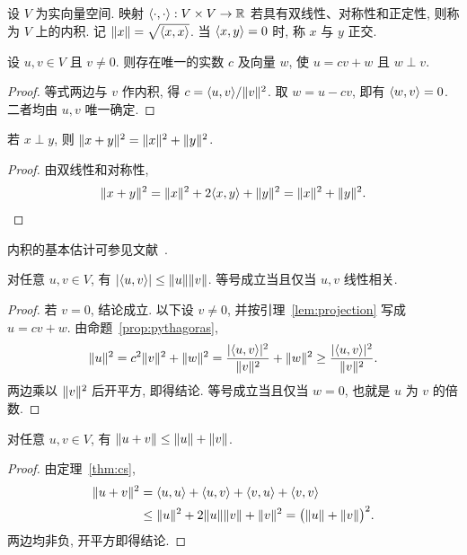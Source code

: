 \begin{definition}
设 $V$ 为实向量空间. 映射 $\langle \cdot,\cdot\rangle:V\times V\to\mathbb R$
若具有双线性、对称性和正定性, 则称为 $V$ 上的内积.
记 $\lVert x\rVert=\sqrt{\langle x,x\rangle}$. 当 $\langle x,y\rangle=0$ 时, 称 $x$ 与 $y$ 正交.
\end{definition}
\begin{lemma}\label{lem:projection}
设 $u,v\in V$ 且 $v\ne0$. 则存在唯一的实数 $c$ 及向量 $w$, 使
$u=cv+w$ 且 $w\perp v$.
\end{lemma}
\begin{proof}
等式两边与 $v$ 作内积, 得 $c=\langle u,v\rangle/\lVert v\rVert^{2}$.
取 $w=u-cv$, 即有 $\langle w,v\rangle=0$. 二者均由 $u,v$ 唯一确定.
\end{proof}
\begin{proposition}\label{prop:pythagoras}
若 $x\perp y$, 则 $\lVert x+y\rVert^{2}=\lVert x\rVert^{2}+\lVert y\rVert^{2}$.
\end{proposition}
\begin{proof}
由双线性和对称性,
\[
\lVert x+y\rVert^{2}=\lVert x\rVert^{2}+2\langle x,y\rangle+\lVert y\rVert^{2}
=\lVert x\rVert^{2}+\lVert y\rVert^{2}.\qedhere
\]
\end{proof}
内积的基本估计可参见文献~\cite[第 6A 节]{axler}.
\begin{theorem}[柯西--施瓦茨不等式]\label{thm:cs}
对任意 $u,v\in V$, 有 $|\langle u,v\rangle|\le\lVert u\rVert\lVert v\rVert$.
等号成立当且仅当 $u,v$ 线性相关.
\end{theorem}
\begin{proof}
若 $v=0$, 结论成立. 以下设 $v\ne0$, 并按引理~\ref{lem:projection} 写成 $u=cv+w$.
由命题~\ref{prop:pythagoras},
\[
\lVert u\rVert^{2}=c^{2}\lVert v\rVert^{2}+\lVert w\rVert^{2}
=\frac{|\langle u,v\rangle|^{2}}{\lVert v\rVert^{2}}+\lVert w\rVert^{2}
\ge \frac{|\langle u,v\rangle|^{2}}{\lVert v\rVert^{2}}.
\]
两边乘以 $\lVert v\rVert^{2}$ 后开平方, 即得结论.
等号成立当且仅当 $w=0$, 也就是 $u$ 为 $v$ 的倍数.
\end{proof}
\begin{corollary}\label{cor:triangle}
对任意 $u,v\in V$, 有 $\lVert u+v\rVert\le\lVert u\rVert+\lVert v\rVert$.
\end{corollary}
\begin{proof}
由定理~\ref{thm:cs},
\begin{align*}
\lVert u+v\rVert^{2}
 &=\langle u,u\rangle+\langle u,v\rangle+\langle v,u\rangle+\langle v,v\rangle\\
 &\le\lVert u\rVert^{2}+2\lVert u\rVert\lVert v\rVert+\lVert v\rVert^{2}
 =\bigl(\lVert u\rVert+\lVert v\rVert\bigr)^{2}.
\end{align*}
两边均非负, 开平方即得结论.
\end{proof}
